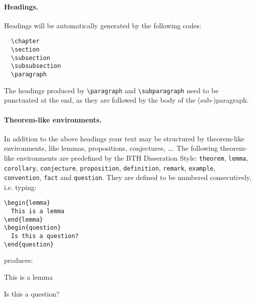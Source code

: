 \paragraph*{Headings.}
Headings will be automatically generated by the following codes:
\begin{verbatim}
  \chapter
  \section
  \subsection
  \subsubsection
  \paragraph
\end{verbatim}
The headings produced by \verb|\paragraph| and \verb|\subparagraph| need to be punctuated at the end, as they are followed by the body of the (sub-)paragraph.

\paragraph*{Theorem-like environments.}
In addition to the above headings your text may be structured by theorem-like environments, like lemmas, propositions, conjectures, \ldots .
The following theorem-like environments are predefined by the BTH Disseration Style: \verb|theorem|, \verb|lemma|, \verb|corollary|, \verb|conjecture|, \verb|proposition|, \verb|definition|, \verb|remark|, \verb|example|, \verb|convention|, \verb|fact| and \verb|question|.
They are defined to be numbered consecutively, i.e. typing:
\begin{verbatim}
\begin{lemma}
  This is a lemma
\end{lemma}
\begin{question}
  Is this a question?
\end{question}
\end{verbatim}
produces:
\begin{lemma}
  This is a lemma
\end{lemma}
\begin{question}
  Is this a question?
\end{question}

